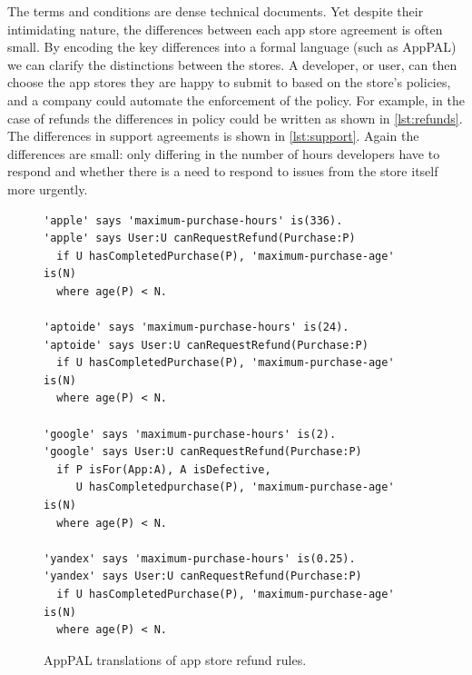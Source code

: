\documentclass[thesis.tex]{subfiles}
\begin{document}
The terms and conditions are dense technical documents. Yet despite
their intimidating nature, the differences between each app store
agreement is often small. By encoding the key differences into a
formal language (such as AppPAL) we can clarify the distinctions
between the stores. A developer, or user, can then choose the app
stores they are happy to submit to based on the store's policies, and
a company could automate the enforcement of the policy. For example,
in the case of refunds the differences in policy could be written as
shown in \autoref{lst:refunds}. The differences in support agreements
is shown in \autoref{lst:support}. Again the differences are small:
only differing in the number of hours developers have to respond and
whether there is a need to respond to issues from the store itself
more urgently.

\begin{figure}\centering
\begin{lstlisting}
'apple' says 'maximum-purchase-hours' is(336).
'apple' says User:U canRequestRefund(Purchase:P)
  if U hasCompletedPurchase(P), 'maximum-purchase-age' is(N)
  where age(P) < N.

'aptoide' says 'maximum-purchase-hours' is(24).
'aptoide' says User:U canRequestRefund(Purchase:P)
  if U hasCompletedPurchase(P), 'maximum-purchase-age' is(N)
  where age(P) < N.

'google' says 'maximum-purchase-hours' is(2).
'google' says User:U canRequestRefund(Purchase:P)
  if P isFor(App:A), A isDefective,
     U hasCompletedpurchase(P), 'maximum-purchase-age' is(N)
  where age(P) < N.

'yandex' says 'maximum-purchase-hours' is(0.25).
'yandex' says User:U canRequestRefund(Purchase:P)
  if U hasCompletedPurchase(P), 'maximum-purchase-age' is(N)
  where age(P) < N.
\end{lstlisting}
\caption{AppPAL translations of app store refund rules.}
\label{lst:refunds}
\end{figure}
\end{document}
